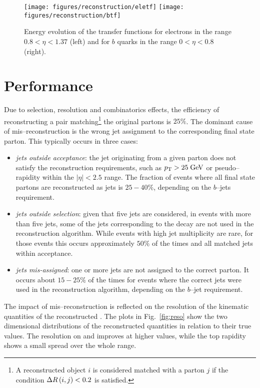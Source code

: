 \begin{figure}[!htb]\centering
  \texttt{[image: figures/reconstruction/eletf]}
  \texttt{[image: figures/reconstruction/btf]}
  \caption[Energy evolution of transfer functions]{
    Energy evolution of the transfer functions for electrons in the
    range $0.8<\eta<1.37$ (left) and for $b$ quarks in the range
    $0<\eta<0.8$ (right). 
    \label{fig:transferfunctions}
    }
\end{figure}

\section{Performance}

Due to selection, resolution and combinatorics effects, the efficiency
of reconstructing a \ttbar{} pair matching\footnote{A reconstructed
  object $i$ is considered matched with a parton $j$ if the condition
  $\Delta{}R\left(i, j\right)<0.2$ is satisfied.} the original partons is
$25\%$. The dominant cause of mis--reconstruction is the wrong jet
assignment to the corresponding \ttbar{} final state parton. This
typically occurs in three cases:
\begin{itemize}
\item {\it jets outside acceptance}: the jet originating from a given
  parton does not satisfy the reconstruction requirements, such as
  $p_{\mathrm{T}}{}>25 \; \mathrm{GeV}$ or pseudo--rapidity within the $|\eta|<2.5$ range.
  The fraction of events where all \ttbar{} final state partons are
  reconstructed as jets is $25-40\%$, depending on the $b$--jets
  requirement.
\item {\it jets outside selection}: given that five jets are
  considered, in events with more
  than five jets, some of the jets corresponding to
  the \ttbar{} decay are not used in the reconstruction algorithm.
  While events with high jet multiplicity are rare, for those events
  this occurs approximately $50\%$ of the times and all matched jets
  within acceptance.
\item {\it jets mis-assigned}: one or more jets are not assigned to
  the correct parton. It occurs about $15-25\%$ of the times for
  events where the correct jets were used in the reconstruction
  algorithm, depending on the $b$--jet requirement.
\end{itemize}

The impact of mis--reconstruction is reflected on the resolution of
the kinematic quantities of the reconstructed \ttbar. The plots
in Fig.~\ref{fig:reso} show the two dimensional distributions of the
reconstructed quantities in relation to their true values. The
resolution on \mtt{} and \pttt{} improves at higher values, while the
top rapidity shows a small spread over the whole range.

